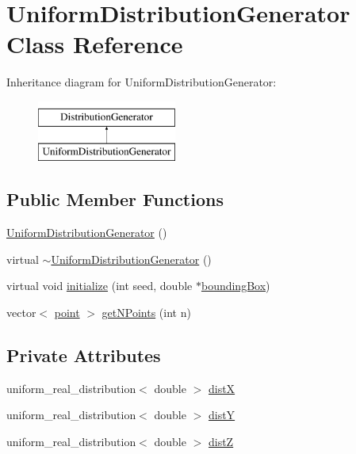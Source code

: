 \hypertarget{class_uniform_distribution_generator}{}\section{Uniform\+Distribution\+Generator Class Reference}
\label{class_uniform_distribution_generator}
Inheritance diagram for Uniform\+Distribution\+Generator\+:\begin{figure}[H]
\begin{center}
\leavevmode
\includegraphics[height=2.000000cm]{db/d6b/class_uniform_distribution_generator}
\end{center}
\end{figure}
\subsection*{Public Member Functions}
\begin{DoxyCompactItemize}
\item 
\hyperlink{class_uniform_distribution_generator_ad736197918a5a3693b9f3dc820896ebb}{Uniform\+Distribution\+Generator} ()
\item 
virtual \hyperlink{class_uniform_distribution_generator_afa568e9c2fa1842b1e7aecd8dee8be85}{$\sim$\+Uniform\+Distribution\+Generator} ()
\item 
virtual void \hyperlink{class_uniform_distribution_generator_a9f40ba5dca7db03833f00a846218ae68}{initialize} (int seed, double $\ast$\hyperlink{class_distribution_generator_abbb670b1d48a4820559097b85bf6ee2d}{bounding\+Box})
\item 
vector$<$ \hyperlink{structpoint}{point} $>$ \hyperlink{class_uniform_distribution_generator_a3628de975c16748b69b5838e4b02ea41}{get\+N\+Points} (int n)
\end{DoxyCompactItemize}
\subsection*{Private Attributes}
\begin{DoxyCompactItemize}
\item 
uniform\+\_\+real\+\_\+distribution$<$ double $>$ \hyperlink{class_uniform_distribution_generator_a1e5c1a311993315dd08d2ef17e74e84d}{distX}
\item 
uniform\+\_\+real\+\_\+distribution$<$ double $>$ \hyperlink{class_uniform_distribution_generator_ada3c6906156a827e079a8085546a27c8}{distY}
\item 
uniform\+\_\+real\+\_\+distribution$<$ double $>$ \hyperlink{class_uniform_distribution_generator_ad5b89c08f50e76a4827af2e6eb9c5df8}{distZ}
\end{DoxyCompactItemize}
